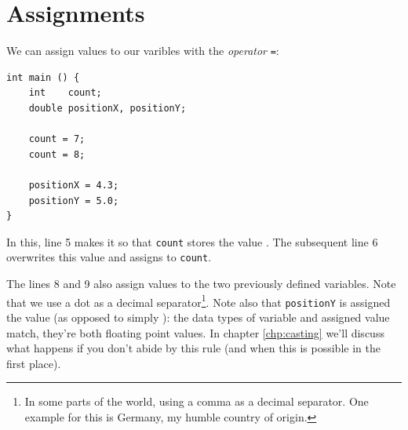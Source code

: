 \section{Assignments} \label{sec:valueAssignment}
We can assign values to our varibles with the \emph{operator} \texttt{=}:
\begin{codebox}[assignments.c]
\begin{verbatim}
int main () {
    int    count;
    double positionX, positionY;

    count = 7;
    count = 8;

    positionX = 4.3;
    positionY = 5.0;
}
\end{verbatim}
 \label{code:simpleAssignment}
\end{codebox}

In this, line 5 makes it so that \texttt{count} stores the value . The subsequent line 6 overwrites this value and assigns  to \texttt{count}.

The lines 8 and 9 also assign values to the two previously defined  variables. Note that we use a dot as a decimal separator\footnote{In some parts of the world, using a comma as a decimal separator. One example for this is Germany, my humble country of origin.}. Note also that \texttt{positionY} is assigned the value  (as opposed to simply ): the data types of variable and assigned value match, \ie they're both floating point values. In chapter \ref{chp:casting} we'll discuss what happens if you don't abide by this rule (and when this is possible in the first place).

